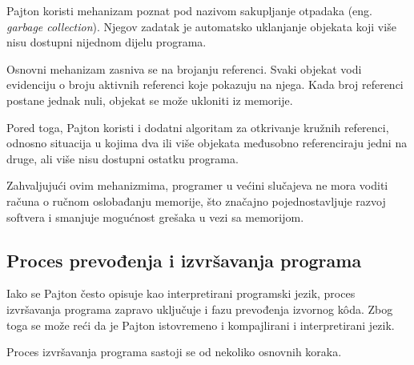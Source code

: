 Pajton koristi mehanizam poznat pod nazivom sakupljanje otpadaka (eng. \textit{garbage collection}). Njegov zadatak je automatsko uklanjanje objekata koji više nisu dostupni nijednom dijelu programa.

Osnovni mehanizam zasniva se na brojanju referenci. Svaki objekat vodi evidenciju o broju aktivnih referenci koje pokazuju na njega. Kada broj referenci postane jednak nuli, objekat se može ukloniti iz memorije.

Pored toga, Pajton koristi i dodatni algoritam za otkrivanje kružnih referenci, odnosno situacija u kojima dva ili više objekata međusobno referenciraju jedni na druge, ali više nisu dostupni ostatku programa.

Zahvaljujući ovim mehanizmima, programer u većini slučajeva ne mora voditi računa o ručnom oslobađanju memorije, što značajno pojednostavljuje razvoj softvera i smanjuje mogućnost grešaka u vezi sa memorijom.

\subsection{Proces prevođenja i izvršavanja programa}

Iako se Pajton često opisuje kao interpretirani programski jezik, proces izvršavanja programa zapravo uključuje i fazu prevođenja izvornog k\^oda. Zbog toga se može reći da je Pajton istovremeno i kompajlirani i interpretirani jezik.

Proces izvršavanja programa sastoji se od nekoliko osnovnih koraka.

